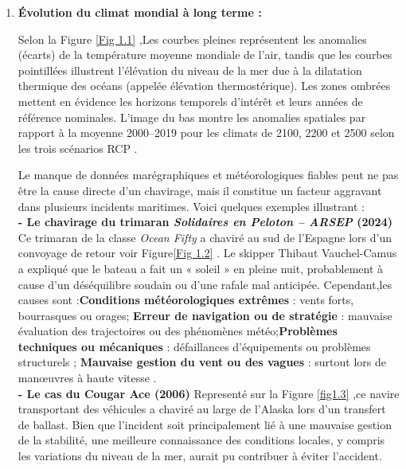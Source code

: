 \documentclass[a4paper,12pt,openany]{report}
\begin{document}
\begin{enumerate}
	\item \textbf{Évolution du climat mondial à long terme :}
	
	\quad Selon la Figure \ref{Fig 1.1} ,Les courbes pleines représentent les anomalies (écarts) de la température moyenne mondiale de l’air, tandis que les courbes pointillées illustrent l’élévation du niveau de la mer due à la dilatation thermique des océans (appelée élévation thermostérique). Les zones ombrées mettent en évidence les horizons temporels d’intérêt et leurs années de référence nominales. L’image du bas montre les anomalies spatiales par rapport à la moyenne 2000–2019 pour les climats de 2100, 2200 et 2500 selon les trois scénarios RCP \cite{Lyon2021}.
	
	\quad Le manque de données marégraphiques et météorologiques fiables peut ne pas être la cause directe d’un chavirage, mais il constitue un facteur aggravant dans plusieurs incidents maritimes. Voici quelques exemples illustrant  :\\
	
	\quad \textbf{- Le chavirage du trimaran \emph{Solidaires en Peloton – ARSEP} (2024)}
	Ce trimaran de la classe \emph{Ocean Fifty} a chaviré au sud de l’Espagne lors d’un convoyage de retour voir Figure\ref{Fig 1.2} . Le skipper Thibaut Vauchel-Camus a expliqué que le bateau a fait un « soleil » en pleine nuit, probablement à cause d’un déséquilibre soudain ou d’une rafale mal anticipée.
	Cependant,les causes sont  :\textbf{Conditions météorologiques extrêmes} : vents forts, bourrasques ou orages; \textbf{Erreur de navigation ou de stratégie} : mauvaise évaluation des trajectoires ou des phénomènes météo;\textbf{Problèmes techniques ou mécaniques} : défaillances d’équipements ou problèmes structurels ; \textbf{Mauvaise gestion du vent ou des vagues} : surtout lors de manœuvres à haute vitesse \cite{Bianchi2017}.\\
	\quad \textbf{- Le cas du Cougar Ace (2006)   }
	Representé sur la Figure \ref{fig1.3} ,ce navire transportant des véhicules a chaviré au large de l’Alaska lors d’un transfert de ballast. Bien que l’incident soit principalement lié à une mauvaise gestion de la stabilité, une meilleure connaissance des conditions locales, y compris les variations du niveau de la mer, aurait pu contribuer à éviter l’accident\cite{USCG2006}.
\end{enumerate}
\end{document}
